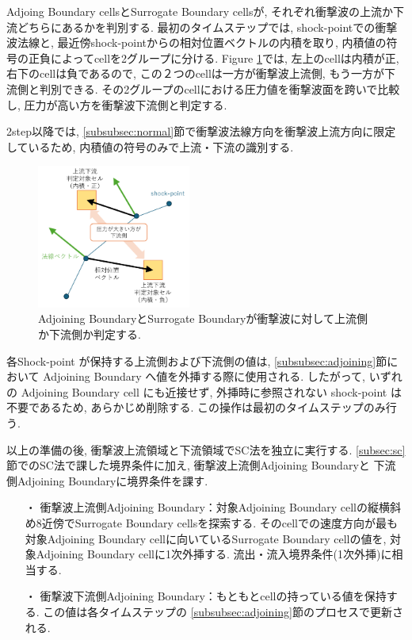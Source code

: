 \documentclass[a4j]{jarticle}
\begin{document}
Adjoing Boundary cellsとSurrogate Boundary cellsが, それぞれ衝撃波の上流か下流どちらにあるかを判別する.
最初のタイムステップでは, shock-pointでの衝撃波法線と, 最近傍shock-pointからの相対位置ベクトルの内積を取り, 内積値の符号の正負によってcellを2グループに分ける.
Figure \ref{fig:updownjudge}では, 左上のcellは内積が正, 右下のcellは負であるので, この２つのcellは一方が衝撃波上流側, もう一方が下流側と判別できる.
その2グループのcellにおける圧力値を衝撃波面を跨いで比較し, 圧力が高い方を衝撃波下流側と判定する.

2step以降では, \ref{subsubsec:normal}節で衝撃波法線方向を衝撃波上流方向に限定しているため, 
内積値の符号のみで上流・下流の識別する.
\begin{figure}[h]
    \begin{center}
        \includegraphics[width=0.45\textwidth]{updownjudge.pdf}
    \end{center}
    \caption{Adjoining BoundaryとSurrogate Boundaryが衝撃波に対して上流側か下流側か判定する.}
    \label{fig:updownjudge}
\end{figure}
各Shock-point が保持する上流側および下流側の値は, \ref{subsubsec:adjoining}節において Adjoining Boundary へ値を外挿する際に使用される.
したがって, いずれの Adjoining Boundary cell にも近接せず, 外挿時に参照されない shock-point は不要であるため, あらかじめ削除する.
この操作は最初のタイムステップのみ行う.

以上の準備の後, 衝撃波上流領域と下流領域でSC法を独立に実行する. \ref{subsec:sc}節でのSC法で課した境界条件に加え, 衝撃波上流側Adjoining Boundaryと
下流側Adjoining Boundaryに境界条件を課す.
\begin{itemize}
  \item[・]  衝撃波上流側Adjoining Boundary：対象Adjoining Boundary cellの縦横斜め8近傍でSurrogate Boundary cellsを探索する. 
            そのcellでの速度方向が最も対象Adjoining Boundary cellに向いているSurrogate Boundary cellの値を, 対象Adjoining Boundary cellに1次外挿する. 流出・流入境界条件(1次外挿)に相当する.
  \item[・]  衝撃波下流側Adjoining Boundary：もともとcellの持っている値を保持する. この値は各タイムステップの
            \ref{subsubsec:adjoining}節のプロセスで更新される.
\end{itemize}
\end{document}
